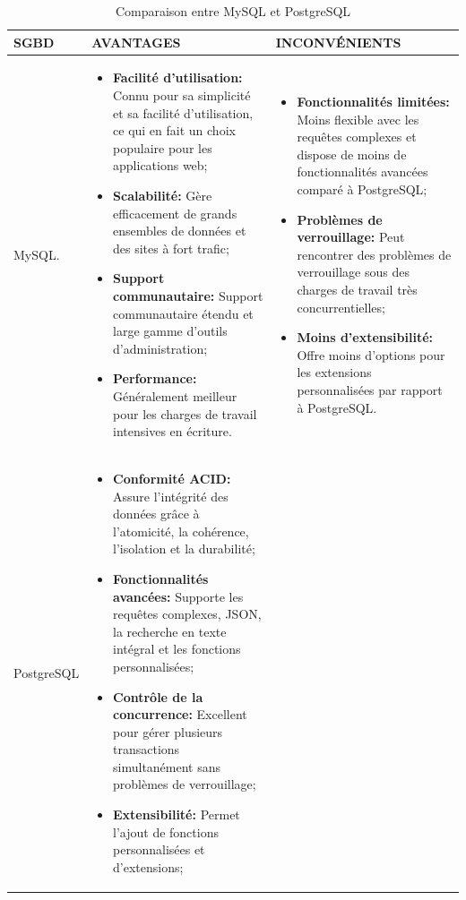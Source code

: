 \documentclass[12pt]{report}
\begin{document}
				\begin{longtable}{|p{3cm}|p{5.5cm}|p{5.5cm}|} 
						\caption{Comparaison entre MySQL et PostgreSQL} 
						\label{tab:DBcomp}\\ 
						\hline 
						SGBD & AVANTAGES & INCONVÉNIENTS\\ 
						\hline 
						\endfirsthead 	
						\endhead
						MySQL. &
						\begin{itemize}
							\item \textbf{Facilité d'utilisation:} Connu pour sa simplicité et sa facilité d'utilisation, ce qui en fait un choix populaire pour les applications web;
							\item \textbf{Scalabilité:} Gère efficacement de grands ensembles de données et des sites à fort trafic;
							\item \textbf{Support communautaire:} Support communautaire étendu et large gamme d'outils d'administration;
							\item \textbf{Performance:}  Généralement meilleur pour les charges de travail intensives en écriture.
						\end{itemize}
						&
						\begin{itemize}
							\item \textbf{Fonctionnalités limitées:} Moins flexible avec les requêtes complexes et dispose de moins de fonctionnalités avancées comparé à PostgreSQL;
							\item \textbf{Problèmes de verrouillage:} Peut rencontrer des problèmes de verrouillage sous des charges de travail très concurrentielles;
							\item \textbf{Moins d'extensibilité:} Offre moins d'options pour les extensions personnalisées par rapport à PostgreSQL.
						\end{itemize}\\						
						\hline
						PostgreSQL &
						\begin{itemize}
							\item \textbf{Conformité ACID:} Assure l'intégrité des données grâce à l'atomicité, la cohérence, l'isolation et la durabilité;
							\item \textbf{Fonctionnalités avancées:} Supporte les requêtes complexes, JSON, la recherche en texte intégral et les fonctions personnalisées;
							\item \textbf{Contrôle de la concurrence:} Excellent pour gérer plusieurs transactions simultanément sans problèmes de verrouillage;
							\item \textbf{Extensibilité:} Permet l'ajout de fonctions personnalisées et d'extensions;

\end{itemize}
\end{longtable}
\end{document}
